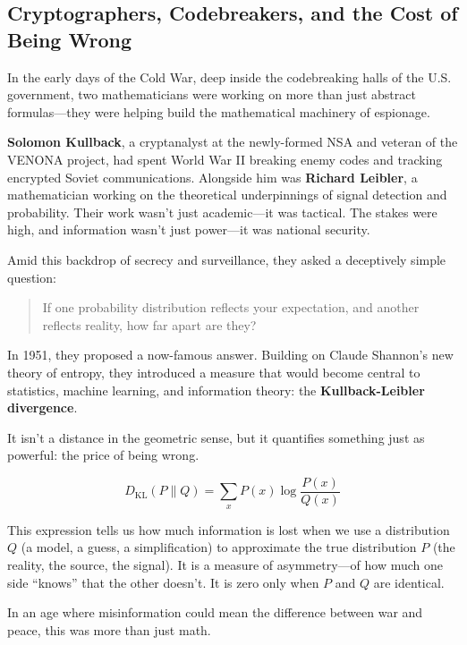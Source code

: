 \subsection{Cryptographers, Codebreakers, and the Cost of Being Wrong}

In the early days of the Cold War, deep inside the codebreaking halls of the U.S. government, two mathematicians were working on more than just abstract formulas—they were helping build the mathematical machinery of espionage.

\textbf{Solomon Kullback}, a cryptanalyst at the newly-formed NSA and veteran of the VENONA project, had spent World War II breaking enemy codes and tracking encrypted Soviet communications. Alongside him was \textbf{Richard Leibler}, a mathematician working on the theoretical underpinnings of signal detection and probability. Their work wasn’t just academic—it was tactical. The stakes were high, and information wasn’t just power—it was national security.

Amid this backdrop of secrecy and surveillance, they asked a deceptively simple question:

\begin{quote}
If one probability distribution reflects your expectation, and another reflects reality, how far apart are they?
\end{quote}

In 1951, they proposed a now-famous answer. Building on Claude Shannon’s new theory of entropy, they introduced a measure that would become central to statistics, machine learning, and information theory: the \textbf{Kullback-Leibler divergence}.

It isn’t a distance in the geometric sense, but it quantifies something just as powerful: the price of being wrong.

\[
D_{\mathrm{KL}}(P \parallel Q) = \sum_x P(x) \log \frac{P(x)}{Q(x)}
\]

This expression tells us how much information is lost when we use a distribution \( Q \) (a model, a guess, a simplification) to approximate the true distribution \( P \) (the reality, the source, the signal). It is a measure of asymmetry—of how much one side ``knows'' that the other doesn't. It is zero only when \( P \) and \( Q \) are identical.

In an age where misinformation could mean the difference between war and peace, this was more than just math.

\vspace{1em}

